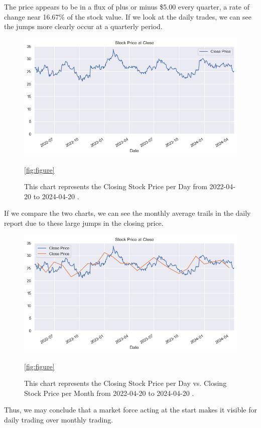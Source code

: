 \documentclass[9pt,a4paper,twoside]{tau}
\begin{document}
        The price appears to be in a flux of plus or minus \$5.00 every quarter, a rate of change near 16.67\% of the stock value. If we look at the daily trades, we can see the jumps more clearly occur at a quarterly period. 
            \begin{figure}[H]
                \centering
                \includegraphics[width=0.85\columnwidth]{Figures/CloseDataSet1d.png}
                \caption{This chart represents the Closing Stock Price per Day from 2022-04-20 to 2024-04-20 \cite{yahoo-finance-2024}.}
                \ref{fig:figure}
            \end{figure}
        
        If we compare the two charts, we can see the monthly average trails in the daily report due to these large jumps in the closing price.
            \begin{figure}[H]
                \centering
                \includegraphics[width=0.85\columnwidth]{Figures/CloseDataSet1dvs1mo.png}
                \caption{This chart represents the Closing Stock Price per Day vs. Closing Stock Price per Month from 2022-04-20 to 2024-04-20 \cite{yahoo-finance-2024}.}
                \ref{fig:figure}
            \end{figure}
        
        Thus, we may conclude that a market force acting at the start makes it visible for daily trading over monthly trading.
        
\end{document}
